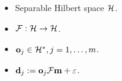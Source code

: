 \documentclass{beamer}
\begin{document}
\begin{frame}
  \begin{columns}
    \begin{column}{0.5\textwidth}
      
      \begin{itemize}
      \item<3-> Separable Hilbert space $\mathcal{H}$.
      \item<4-> \(\mathcal{F}: \mathcal{H} \to \mathcal{H}\).
      \item<5-> \(\mathbf{o}_j \in \mathcal{H}^*, j=1,\dots,m \).
      \item<6-> \(\mathbf{d}_j := \mathbf{o}_j \mathcal{F} \mathbf{m} + \varepsilon\).%
      \end{itemize}
  
      \begin{figure}
        \centering
      \end{figure}
    \end{column}

    \begin{column}{0.5\textwidth}


\end{column}
\end{columns}
\end{frame}
\end{document}

